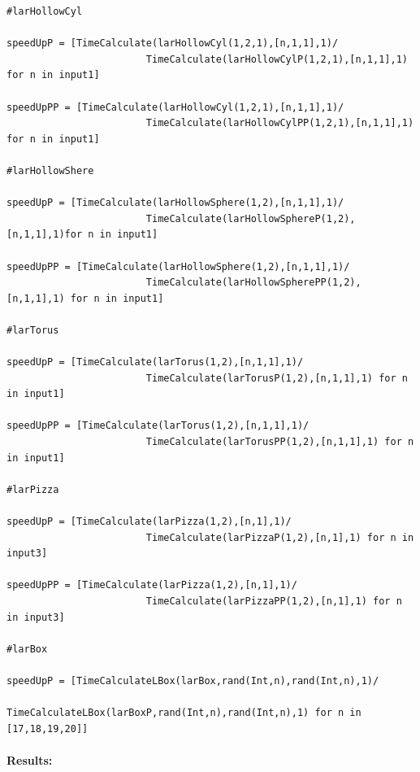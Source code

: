 \documentclass{article}
\begin{document}
\begin{Verbatim}
#larHollowCyl

speedUpP = [TimeCalculate(larHollowCyl(1,2,1),[n,1,1],1)/
                        TimeCalculate(larHollowCylP(1,2,1),[n,1,1],1) for n in input1]

speedUpPP = [TimeCalculate(larHollowCyl(1,2,1),[n,1,1],1)/
                        TimeCalculate(larHollowCylPP(1,2,1),[n,1,1],1) for n in input1]

#larHollowShere

speedUpP = [TimeCalculate(larHollowSphere(1,2),[n,1,1],1)/
                        TimeCalculate(larHollowSphereP(1,2),[n,1,1],1)for n in input1]

speedUpPP = [TimeCalculate(larHollowSphere(1,2),[n,1,1],1)/
                        TimeCalculate(larHollowSpherePP(1,2),[n,1,1],1) for n in input1]

#larTorus

speedUpP = [TimeCalculate(larTorus(1,2),[n,1,1],1)/
                        TimeCalculate(larTorusP(1,2),[n,1,1],1) for n in input1]

speedUpPP = [TimeCalculate(larTorus(1,2),[n,1,1],1)/
                        TimeCalculate(larTorusPP(1,2),[n,1,1],1) for n in input1]

#larPizza

speedUpP = [TimeCalculate(larPizza(1,2),[n,1],1)/
                        TimeCalculate(larPizzaP(1,2),[n,1],1) for n in input3]

speedUpPP = [TimeCalculate(larPizza(1,2),[n,1],1)/
                        TimeCalculate(larPizzaPP(1,2),[n,1],1) for n in input3]

#larBox
 
speedUpP = [TimeCalculateLBox(larBox,rand(Int,n),rand(Int,n),1)/
                    TimeCalculateLBox(larBoxP,rand(Int,n),rand(Int,n),1) for n in [17,18,19,20]]
\end{Verbatim}

\paragraph{Results:}
\end{document}
